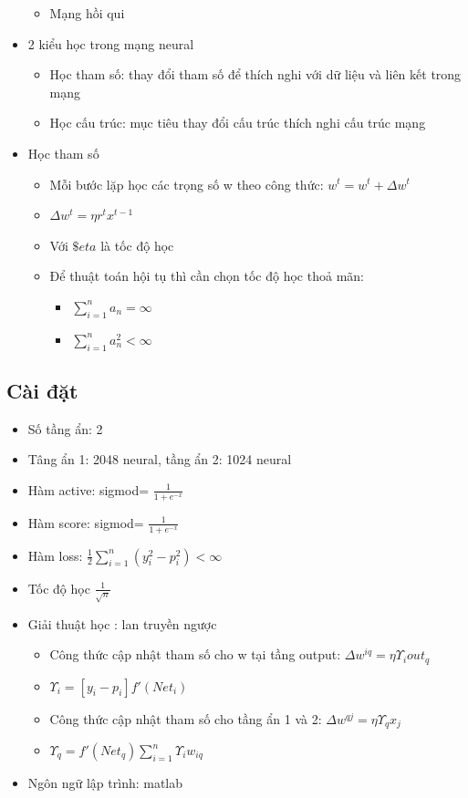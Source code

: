 \documentclass[a4paper,12pt]{report}
\begin{document}
\begin{itemize}
\begin{itemize}
\item Mạng hồi qui
\end{itemize}
\item 2 kiểu học trong mạng neural
\begin{itemize}
\item Học tham số: thay đổi tham số để thích nghi với dữ liệu và liên kết trong mạng 
\item Học cấu trúc: mục tiêu thay đổi cấu trúc thích nghi cấu trúc mạng 
\end{itemize}
\item Học tham số
\begin{itemize}
 \item Mỗi bước lặp học các trọng số w theo công thức: $w^t=w^t + \Delta w^{t}$
 \item $\Delta w^{t}=\eta r^tx^{t-1}$
 \item Với $\$eta$ là tốc độ học
 \item Để thuật toán hội tụ thì cần chọn tốc độ học thoả mãn:
 \begin{itemize}
 \item $\sum_{i=1}^na_n=\infty$
 \item $\sum_{i=1}^na_n^2<\infty$
 \end{itemize}
\end{itemize}
\end{itemize}
\subsection{Cài đặt}
\begin{itemize}
\item Số tầng ẩn: 2
\item Tâng ẩn 1: 2048 neural, tầng ẩn 2: 1024 neural
\item Hàm active: sigmod= $\frac{1}{1+e^{-x}}$
\item Hàm score: sigmod= $\frac{1}{1+e^{-x}}$
\item Hàm loss: $\frac{1}{2}\sum_{i=1}^n(y_i^2-p_i^2)<\infty$
\item Tốc độ học $\frac{1}{ \sqrt{n}} $
\item Giải thuật học : lan truyền ngược
\begin{itemize}
\item Công thức cập nhật tham số cho w tại tầng output: $\Delta w^{iq }=\eta \Upsilon_i out_q$
\item $\Upsilon_i=[y_i - p_i]f'(Net_i)$
\item Công thức cập nhật tham số cho tầng ẩn 1 và 2: $\Delta w^{qj}=\eta \Upsilon_q x_j$
\item $\Upsilon_q=f'(Net_q)\sum_{i=1}^n\Upsilon_i w_{iq}$
\end{itemize}
\item Ngôn ngữ lập trình: matlab
\end{itemize}
\end{document}
